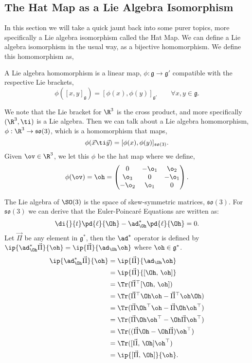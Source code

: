 
\subsection{The Hat Map as a Lie Algebra Isomorphism}
In this section we will take a quick jaunt back into some purer topics, more specifically a Lie algebra isomorphism called the Hat Map. We can define a Lie algebra isomorphism in the usual way, as a bijective homomorphism. We define this homomorphism as,
\begin{ndefi}
  A Lie algebra homomorphism is a linear map, $\phi : \mathfrak{g} \to \mathfrak{g}'$ compatible with the respective Lie brackets,
  $$ \phi([x, y]_\mathfrak{g}) = [\phi(x), \phi(y)]_{\mathfrak{g}'} \qquad \forall x, y \in \mathfrak{g}. $$
\end{ndefi}

\noindent
We note that the Lie bracket for $\R^3$ is the cross product, and more specifically $(\R^3, \ti)$ is a Lie algebra. Then we can talk about a Lie algebra homomorphism, $\phi : \R^3 \to \mathfrak{so}(3)$, which is a homomorphism that maps,
$$ \phi(\vec x \ti \vec y) = [\phi (x), \phi (y)]_{\mathfrak{so}(3)}. $$
Given $\ov \in \R^3$, we let this $\phi$ be the hat map where we define,
$$ \phi(\ov) = \oh = \begin{pmatrix}
  0 & -\o_1 & \o_2 \\ \o_3 & 0 & -\o_1 \\ -\o_2 & \o_1 & 0
\end{pmatrix}. $$

\noindent
The Lie algebra of $\SO(3)$ is the space of skew-symmetric matrices, $\mathfrak{so}(3)$. For $\mathfrak{so}(3)$ we can derive that the Euler-Poincar\'e Equations are written as:
$$ \di {}{t} \pd{\ell}{\Oh} - \ad^*_{\Oh}\pd{\ell}{\Oh} = 0. $$
Let $\vec\Pi$ be any element in $\mathfrak{g}^*$, then the $\ad^*$ operator is defined by $\ip{\ad_{\Oh}^*\vec\Pi}{\oh} = \ip{\vec\Pi}{\ad_{\Oh}{\oh}}$ where $\oh \in \mathfrak{g}^*$.
\begin{align*}
  \ip{\ad_{\Oh}^*\vec\Pi}{\oh} &= \ip{\vec\Pi}{\ad_{\Oh}{\oh}}\\
  &= \ip{\vec\Pi}{[\Oh,\,\oh]}\\
  &= \Tr(\vec\Pi^\top [\Oh,\,\oh])\\
  &= \Tr(\vec\Pi^\top \Oh\oh - \vec\Pi^\top\oh\Oh)\\
  &= \Tr(\vec\Pi\Oh^\top\oh - \vec\Pi\Oh\oh^\top)\\
  &= \Tr(\vec\Pi\Oh\oh^\top - \Oh\vec\Pi\oh^\top) \\
  &= \Tr((\vec\Pi\Oh - \Oh\vec\Pi)\oh^\top) \\
  &= \Tr([\vec\Pi,\,\Oh]\oh^\top) \\
  &= \ip{[\vec\Pi,\,\Oh]}{\oh}.
\end{align*}

